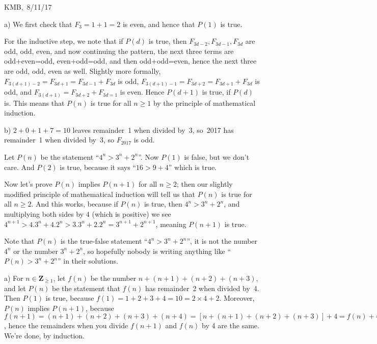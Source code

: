 \documentclass[10pt]{article}
\newcommand{\Z}{\mathbf{Z}}
\begin{document}
\begin{flushright} KMB,\ 8/11/17\end{flushright}


\medskip{} 

a) We first check that $F_3=1+1=2$ is even, and hence that $P(1)$ is true.

For the inductive step, we note that if $P(d)$ is true, then $F_{3d-2},F_{3d-1},F_{3d}$ are odd, odd, even, and now continuing the pattern, the next three terms are odd+even=odd, even+odd=odd, and then odd+odd=even, hence the next three are odd, odd, even as well. Slightly more formally, $F_{3(d+1)-2}=F_{3d+1}=F_{3d-1}+F_{3d}$ is odd, $F_{3(d+1)-1}=F_{3d+2}=F_{3d+1}+F_{3d}$ is odd, and $F_{3(d+1)}=F_{3d+2}+F_{3d=1}$ is even. Hence $P(d+1)$ is true, if $P(d)$ is. This means that $P(n)$ is true for all $n\geq1$ by the principle of mathematical induction.

b) $2+0+1+7=10$ leaves remainder~1 when divided by~3, so~2017 has remainder~1 when divided by~3, so $F_{2017}$ is odd.

\medskip{} Let $P(n)$ be the statement ``$4^n>3^n+2^n$''. Now $P(1)$ is false, but we don't care. And $P(2)$ is true, because it says ``$16>9+4$'' which is true.

Now let's prove $P(n)$ implies $P(n+1)$ for all $n\geq2$; then our slightly modified principle of mathematical induction will tell us that $P(n)$ is true for all $n\geq2$. And this works, because if $P(n)$ is true, then $4^n>3^n+2^n$, and multiplying both sides by 4 (which is positive) we see $4^{n+1}>4.3^n+4.2^n>3.3^n+2.2^n=3^{n+1}+2^{n+1}$, meaning $P(n+1)$ is true.

Note that $P(n)$ is the true-false statement ``$4^n>3^n+2^n$'', it is not the number $4^n$ or the number $3^n+2^n$, so hopefully nobody is writing anything like ``$P(n)>3^n+2^n$'' in their solutions.

\medskip{} 

a) For $n\in\Z_{\geq1}$, let $f(n)$ be the number $n+(n+1)+(n+2)+(n+3)$, and let $P(n)$ be the statement that $f(n)$ has remainder~2 when divided by~4. Then $P(1)$ is true, because $f(1)=1+2+3+4=10=2\times4+2$. Moreover, $P(n)$ implies $P(n+1)$, because $f(n+1)=(n+1)+(n+2)+(n+3)+(n+4)=[n+(n+1)+(n+2)+(n+3)]+4=f(n)+4$, hence the remainders when you divide $f(n+1)$ and $f(n)$ by 4 are the same. We're done, by induction.
\end{document}
